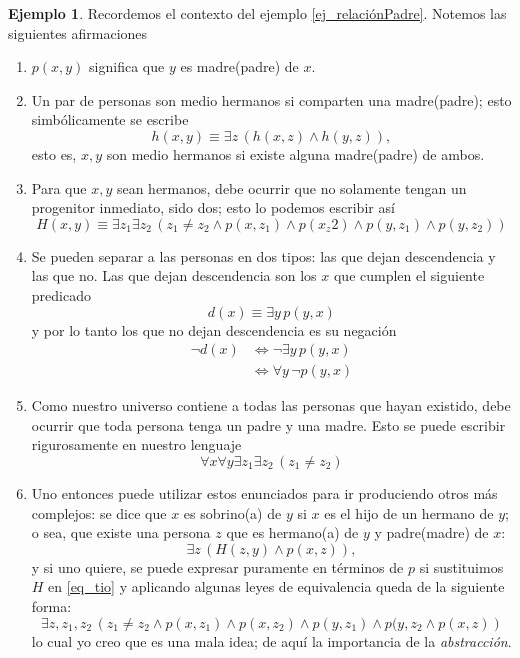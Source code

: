 \documentclass{book}
\theoremstyle{definition}
\newtheorem{ejm}{Ejemplo}[chapter]
\begin{document}
\begin{ejm}
	Recordemos el contexto del ejemplo \ref{ej_relaciónPadre}.
	Notemos las siguientes afirmaciones
	\begin{enumerate}
		\item $p(x,y)$ significa que $y$ es madre(padre) de $x$.
		\item Un par de personas son medio hermanos si comparten una madre(padre); esto simbólicamente se escribe \[h(x,y) \equiv \exists z \, \left( h(x,z) \wedge h(y,z)\right),\]
		esto es, $x,y$ son medio hermanos si existe alguna madre(padre) de ambos.
		
		\item Para que $x,y$ sean hermanos, debe ocurrir que no solamente tengan un progenitor inmediato, sido dos; esto lo podemos escribir así
		\[H(x,y)\equiv \exists z_1 \exists z_2 \, \left(z_1 \neq z_2 \wedge p(x,z_1) \wedge p(x_z2) \wedge p(y,z_1) \wedge p(y,z_2) \right) \]
		
		\item Se pueden separar a las personas en dos tipos: las que dejan descendencia y las que no.
		Las que dejan descendencia son los $x$ que cumplen el siguiente predicado
		\[d(x)\equiv \exists y\, p(y,x) \]
		y por lo tanto los que no dejan descendencia es su negación
		\begin{align*}
			\neg d(x) 
			& \iff \neg \exists y\, p(y,x)\\
			& \iff \forall y\, \neg p(y,x)
		\end{align*}
		\item Como nuestro universo contiene a todas las personas que hayan existido, debe ocurrir que toda persona tenga un padre y una madre. Esto se puede escribir rigurosamente en nuestro lenguaje  %
		\[\forall x \forall y \exists z_1 \exists z_2 \, \left(z_1 \neq z_2 \right) \]
		\item Uno entonces puede utilizar estos enunciados para ir produciendo otros más complejos: se dice que $x$ es sobrino(a) de $y$ si $x$ es el hijo de un hermano de $y$; o sea, que existe una persona $z$ que es hermano(a) de $y$ y padre(madre) de $x$:
		\begin{equation}\label{eq_tio}
			\exists z \, \left(H(z,y) \wedge p(x,z) \right),
		\end{equation}
		y si uno quiere, se puede expresar puramente en términos de $p$ si sustituimos $H$ en \ref{eq_tio} y aplicando algunas leyes de equivalencia queda de la siguiente forma:
		\begin{equation*}
			\exists z,z_1,z_2 \,
			\left( 
				z_1 \neq z_2 \wedge 
				p(x,z_1) \wedge 
				p(x,z_2) \wedge 
				p(y,z_1) \wedge 
				p(y,z_2	\wedge 
				p(x,z)
			\right)
		\end{equation*}
		lo cual yo creo que es una mala idea; de aquí la importancia de la \emph{abstracción}.
	\end{enumerate}
\end{ejm}
\end{document}

